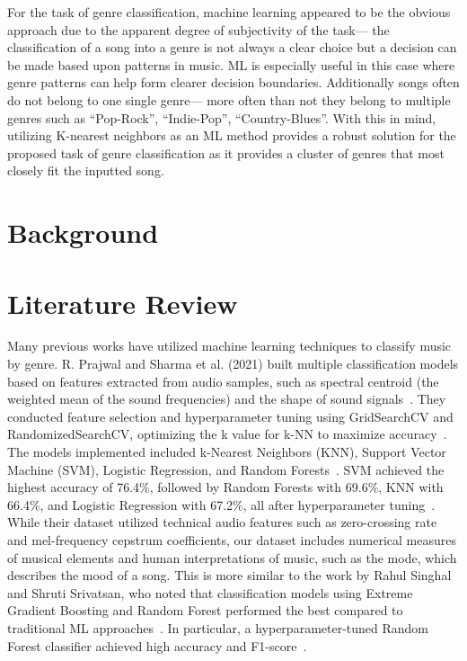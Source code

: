 \documentclass[times, twocolumn]{article}
\begin{document}
For the task of genre classification, machine learning appeared to be the obvious approach due to the apparent degree of subjectivity of the task— the classification of a song into a genre is not always a clear choice but a decision can be made based upon patterns in music. ML is especially useful in this case where genre patterns can help form clearer decision boundaries. Additionally songs often do not belong to one single genre— more often than not they belong to multiple genres such as “Pop-Rock”, “Indie-Pop”, “Country-Blues”. With this in mind, utilizing K-nearest neighbors as an ML method provides a robust solution for the proposed task of genre classification as it provides a cluster of genres that most closely fit the inputted song. 

\section{Background}
\section{Literature Review}
Many previous works have utilized machine learning techniques to classify music by genre. R. Prajwal and Sharma et al. (2021) built multiple classification models based on features extracted from audio samples, such as spectral centroid (the weighted mean of the sound frequencies) and the shape of sound signals~\cite{Singhal2022}. They conducted feature selection and hyperparameter tuning using GridSearchCV and RandomizedSearchCV, optimizing the k value for k-NN to maximize accuracy~\cite{Singhal2022}. The models implemented included k-Nearest Neighbors (KNN), Support Vector Machine (SVM), Logistic Regression, and Random Forests~\cite{Singhal2022}. SVM achieved the highest accuracy of 76.4\%, followed by Random Forests with 69.6\%, KNN with 66.4\%, and Logistic Regression with 67.2\%, all after hyperparameter tuning~\cite{Singhal2022}.\\

While their dataset utilized technical audio features such as zero-crossing rate and mel-frequency cepstrum coefficients, our dataset includes numerical measures of musical elements and human interpretations of music, such as the mode, which describes the mood of a song. This is more similar to the work by Rahul Singhal and Shruti Srivatsan, who noted that classification models using Extreme Gradient Boosting and Random Forest performed the best compared to traditional ML approaches~\cite{prajwal2021music}. In particular, a hyperparameter-tuned Random Forest classifier achieved high accuracy and F1-score~\cite{prajwal2021music}.\\
\end{document}
